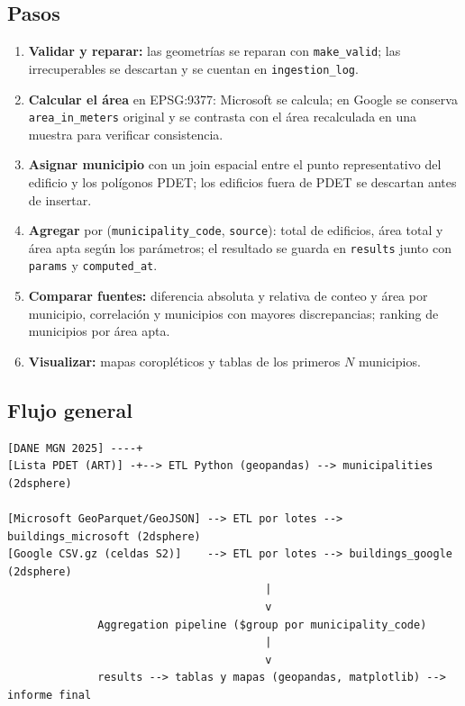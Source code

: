 \documentclass[11pt,letterpaper]{article}
\newenvironment{codebox}{\par\noindent\begin{minipage}{\linewidth}}{\end{minipage}\par}
\begin{document}
\subsection{Pasos}

\begin{enumerate}
  \item \textbf{Validar y reparar:} las geometrías se reparan con \texttt{make\_valid}; las
  irrecuperables se descartan y se cuentan en \texttt{ingestion\_log}.
  \item \textbf{Calcular el área} en EPSG:9377: Microsoft se calcula; en Google se conserva
  \texttt{area\_in\_meters} original y se contrasta con el área recalculada en una muestra para
  verificar consistencia.
  \item \textbf{Asignar municipio} con un join espacial entre el punto representativo del edificio y
  los polígonos PDET; los edificios fuera de PDET se descartan antes de insertar.
  \item \textbf{Agregar} por (\texttt{municipality\_code}, \texttt{source}): total de edificios, área
  total y área apta según los parámetros; el resultado se guarda en \texttt{results} junto con
  \texttt{params} y \texttt{computed\_at}.
  \item \textbf{Comparar fuentes:} diferencia absoluta y relativa de conteo y área por municipio,
  correlación y municipios con mayores discrepancias; ranking de municipios por área apta.
  \item \textbf{Visualizar:} mapas coropléticos y tablas de los primeros $N$ municipios.
\end{enumerate}

\subsection{Flujo general}

\begin{codebox}\begin{lstlisting}[style=lab,numbers=none,language={}]
[DANE MGN 2025] ----+
[Lista PDET (ART)] -+--> ETL Python (geopandas) --> municipalities  (2dsphere)

[Microsoft GeoParquet/GeoJSON] --> ETL por lotes --> buildings_microsoft (2dsphere)
[Google CSV.gz (celdas S2)]    --> ETL por lotes --> buildings_google    (2dsphere)
                                        |
                                        v
              Aggregation pipeline ($group por municipality_code)
                                        |
                                        v
              results --> tablas y mapas (geopandas, matplotlib) --> informe final
\end{lstlisting}\end{codebox}
\end{document}
